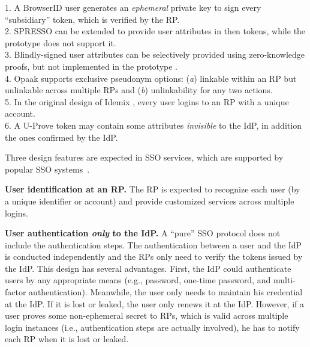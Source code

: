 \begin{table}[tb]
{\footnotesize
1. A BrowserID user generates an \emph{ephemeral} private key to sign every ``subsidiary'' token,
 which is verified by the RP.\\
2. SPRESSO can be extended to provide user attributes in then tokens, while the prototype does not support it.\\
3. Blindly-signed user attributes can be selectively provided using zero-knowledge proofs,
    but not implemented in the prototype \cite{PseudoID}.\\
4. Opaak supports exclusive pseudonym options: (\emph{a}) linkable within an RP but unlinkable across multiple RPs and (\emph{b}) unlinkability for any two actions.\\
5. In the original design of Idemix \cite{idemix}, every user logins to an RP with a unique account.\\
6. A U-Prove token may contain some attributes \emph{invisible} to the IdP, in addition the ones confirmed by the IdP.}
\end{table}

Three design features are expected in SSO services, which are supported by popular SSO systems~\cite{NIST2017draft,OpenIDConnect,rfc6749,SAML,SAMLIdentifier}. 


\noindent \textbf{User identification at an RP.}
The RP is expected to recognize each user (by a unique identifier or account) and provide customized services across multiple logins. 


\noindent\textbf{User authentication {\em only} to the IdP.}
A ``pure'' SSO protocol  \cite{OpenIDConnect,rfc6749,SAML} does not include the authentication steps. The authentication between a user and the IdP is conducted independently and the RPs only need to verify the tokens issued by the IdP. This design has several advantages. First, the IdP could authenticate users by any appropriate means (e.g., password,
one-time password, and multi-factor authentication).
Meanwhile, the user only needs to maintain his credential at the IdP. If it is lost or leaked, the user only renews it at the IdP. However, if a user proves some non-ephemeral secret to RPs, which is valid across multiple login instances (i.e., authentication steps are actually involved), he has to notify each RP when it is lost or leaked. %

